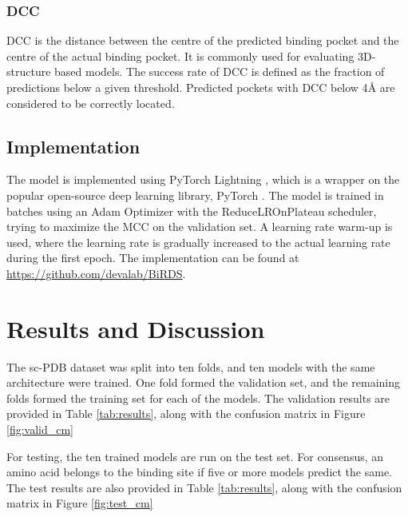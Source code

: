 \documentclass[journal=jacsat,manuscript=article]{achemso}
\begin{document}
\subsubsection{DCC}
DCC is the distance between the centre of the predicted binding pocket and the centre of the actual binding pocket. It is commonly used for evaluating 3D-structure based models. The success rate of DCC is defined as the fraction of predictions below a given threshold. Predicted pockets with DCC below 4{\AA} are considered to be correctly located.

\subsection{Implementation}
\quad The model is implemented using PyTorch Lightning \cite{falcon2019pytorch}, which is a wrapper on the popular open-source deep learning library, PyTorch \cite{paszke2019pytorch}. The model is trained in batches using an Adam Optimizer with the ReduceLROnPlateau scheduler, trying to maximize the MCC on the validation set. A learning rate warm-up is used, where the learning rate is gradually increased to the actual learning rate during the first epoch. The implementation can be found at \href{https://github.com/devalab/BiRDS}{https://github.com/devalab/BiRDS}.

\section{Results and Discussion}
\quad The sc-PDB\cite{desaphy2015sc} dataset was split into ten folds, and ten models with the same architecture were trained. One fold formed the validation set, and the remaining folds
formed the training set for each of the models. The validation results are provided in Table \ref{tab:results}, along with the confusion matrix in Figure \ref{fig:valid_cm}

For testing, the ten trained models are run on the test set. For consensus, an amino acid belongs to the binding site if five or more models predict the same. The test results are also provided in Table \ref{tab:results}, along with the confusion matrix in Figure \ref{fig:test_cm}
\end{document}
